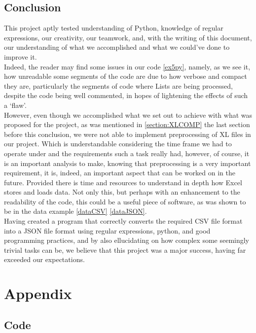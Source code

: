 \documentclass[11pt,a4paper,times]{report}
\begin{document}
\section{Conclusion} \label{conclusion}
This project aptly tested understanding of Python, knowledge of regular expressions,
our creativity, our teamwork, and, with the writing of this document,
our understanding of what we accomplished and what we could've done to improve it.\\
Indeed, the reader may find some issues in our code \ref{ex5py}, namely, as we see it,
how unreadable some segments of the code are due to how verbose and compact they are,
particularly the segments of code where Lists are being processed, despite the code being
well commented, in hopes of lightening the effects of such a `flaw'.\\
However, even though we accomplished what we set out to achieve with what was proposed for the
project, as was mentioned in \ref{section:XLCOMP} the last section before this conclusion,
we were not able to implement preprocessing of XL files in our project.
Which is understandable considering the time frame we had to operate under and
the requirements such a task really had, however, of course, it is an important analysis to make,
knowing that preprocessing is a very important requirement, it is, indeed, an important aspect
that can be worked on in the future. Provided there is time and resources to understand in depth
how Excel stores and loads data. Not only this, but perhaps with an enhancement to the readability
of the code, this could be a useful piece of software, as was shown to be in the data example
\ref{dataCSV} \ref{dataJSON}.\\
Having created a program that correctly converts the required CSV file format
into a JSON file format using regular expressions, python, and good programming practices, and
by also ellucidating on how complex some seemingly trivial tasks can be,
we believe that this project was a major success, having far exceeded our expectations.


\chapter{Appendix} \label{chap:code}
\section{Code}

{}

\end{document}
